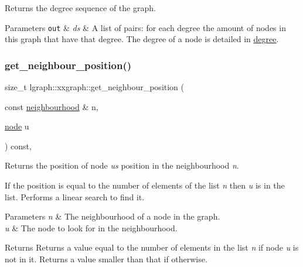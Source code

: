 Returns the degree sequence of the graph. 


\begin{DoxyParams}[1]{Parameters}
\mbox{\tt out}  & {\em ds} & A list of pairs\+: for each degree the amount of nodes in this graph that have that degree. The degree of a node is detailed in \hyperlink{classlgraph_1_1xxgraph_a20ebc2927ee8fb8bb0a2c3b448d9ed78}{degree}. \\
\hline
\end{DoxyParams}
\mbox{\label{classlgraph_1_1xxgraph_abb0c474cb162940aba3439124c1202d7}} 
\subsubsection{\texorpdfstring{get\+\_\+neighbour\+\_\+position()}{get\_neighbour\_position()}}
{\footnotesize\ttfamily size\+\_\+t lgraph\+::xxgraph\+::get\+\_\+neighbour\+\_\+position (\begin{DoxyParamCaption}\item[{const \hyperlink{namespacelgraph_a052e7766c13f3a43cec0aec8173fdede}{neighbourhood} \&}]{n,  }\item[{\hyperlink{namespacelgraph_a397169dd66adf725210a30fb7251773e}{node}}]{u }\end{DoxyParamCaption}) const\hspace{0.3cm}{\ttfamily [protected]}, {\ttfamily [inherited]}}



Returns the position of node {\itshape u\textquotesingle{}s} position in the neighbourhood {\itshape n}. 

If the position is equal to the number of elements of the list {\itshape n} then {\itshape u} is in the list. Performs a linear search to find it.


\begin{DoxyParams}{Parameters}
{\em n} & The neighbourhood of a node in the graph. \\
\hline
{\em u} & The node to look for in the neighbourhood. \\
\hline
\end{DoxyParams}
\begin{DoxyReturn}{Returns}
Returns a value equal to the number of elements in the list {\itshape n} if node {\itshape u} is not in it. Returns a value smaller than that if otherwise. 
\end{DoxyReturn}
\mbox{\label{classlgraph_1_1xxgraph_a745a535506115c66ce0993ef7e7759ba}} 

